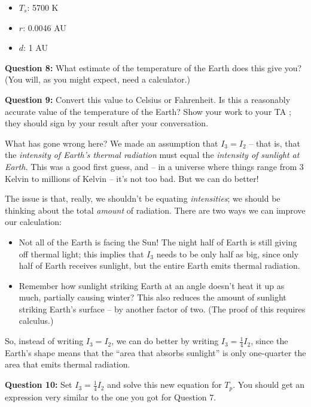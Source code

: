 \documentclass[11pt]{article}
\def\BI{\begin{itemize}}
\def\EI{\end{itemize}}
\begin{document}
\BI
\item $T_s$: 5700 K
\item $r$: 0.0046 AU
\item $d$: 1 AU
\EI


{\bf Question 8:} What estimate of the temperature of the Earth does this give you? (You will, as you might expect, need a calculator.)

\vspace*{2cm}

\hrulefill

{\bf Question 9:} Convert this value to Celsius or Fahrenheit. Is this a reasonably accurate value of the temperature of the Earth? Show your work to your TA ; they should sign by your result after your conversation.

\vspace*{4cm}

\hrulefill

\vspace{1in}

What has gone wrong here? We made an assumption that $I_3=I_2$ -- that is, that the {\it intensity of Earth's thermal radiation} must equal the {\it intensity of sunlight at Earth.}
This was a good first guess, and -- in a universe where things range from 3 Kelvin to millions of Kelvin -- it's not too bad. But we can do better!

The issue is that, really, we shouldn't be equating {\it intensities}; we should be thinking about the total {\it amount} of radiation. There are two ways we can improve our calculation:

\BI
\item Not all of the Earth is facing the Sun! The night half of Earth is still giving off thermal light; this implies that $I_3$ needs to be only half as big, since only half of 
Earth receives sunlight, but the entire Earth emits thermal radiation.
\item Remember how sunlight striking Earth at an angle doesn't heat it up as much, partially causing winter? This also reduces the amount of sunlight striking Earth's surface -- by
another factor of two. (The proof of this requires calculus.)
\EI

So, instead of writing $I_3 = I_2$, we can do better by writing $I_3 = \frac{1}{4} I_2$, since the Earth's shape means that the ``area that absorbs sunlight'' is only one-quarter
the area that emits thermal radiation. 

{\bf Question 10:} Set $I_3 = \frac{1}{4}I_2$ and solve this new equation for $T_p$. You should get an expression very similar to the one you got for Question 7.
\end{document}
